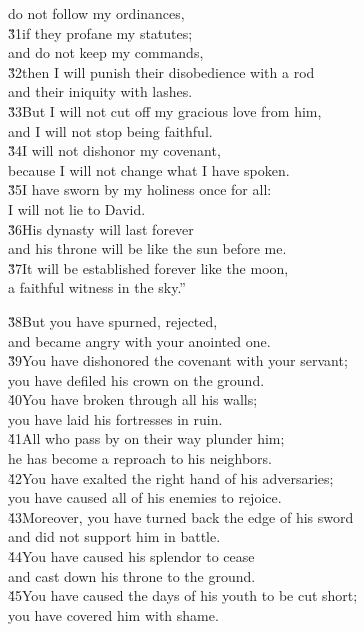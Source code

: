 \begin{poetry}
\poemll    do not follow my ordinances, \\
\poeml \v{31}if they profane my statutes; \\
\poemll    and do not keep my commands, \\
\poeml \v{32}then I will punish their disobedience with a rod \\
\poemll    and their iniquity with lashes. \\
\poeml \v{33}But I will not cut off my gracious love from him, \\
\poemll    and I will not stop being faithful. \\
\poeml \v{34}I will not dishonor my covenant, \\
\poemll    because I will not change what I have spoken. \\
\poeml \v{35}I have sworn by my holiness once for all: \\
\poemll    I will not lie to David. \\
\poeml \v{36}His dynasty will last forever \\
\poemll    and his throne will be like the sun before me. \\
\poeml \v{37}It will be established forever like the moon, \\
\poemll    a faithful witness in the sky.''
\end{poetry}

\begin{poetry}
\poeml \v{38}But you have spurned, rejected, \\
\poemll    and became angry with your anointed one. \\
\poeml \v{39}You have dishonored the covenant with your servant; \\
\poemll    you have defiled his crown on the ground. \\
\poeml \v{40}You have broken through all his walls; \\
\poemll    you have laid his fortresses in ruin. \\
\poeml \v{41}All who pass by on their way plunder him; \\
\poemll    he has become a reproach to his neighbors. \\
\poeml \v{42}You have exalted the right hand of his adversaries; \\
\poemll    you have caused all of his enemies to rejoice. \\
\poeml \v{43}Moreover, you have turned back the edge of his sword \\
\poemll    and did not support him in battle. \\
\poeml \v{44}You have caused his splendor to cease \\
\poemll    and cast down his throne to the ground. \\
\poeml \v{45}You have caused the days of his youth to be cut short; \\
\poemll    you have covered him with shame.
\end{poetry}

